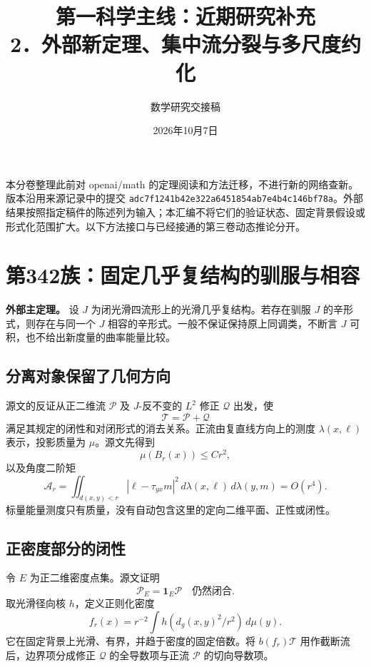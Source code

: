 \documentclass[UTF8,11pt,fontset=none]{ctexart}
\title{第一科学主线：近期研究补充\\[6pt]\large 2．外部新定理、集中流分裂与多尺度约化}
\author{数学研究交接稿}\date{2026年10月7日}
\theoremstyle{definition}
\theoremstyle{remark}
\begin{document}
\maketitle
\tableofcontents
\clearpage
本分卷整理此前对 openai/math 的定理阅读和方法迁移，不进行新的网络查新。版本沿用来源记录中的提交 \texttt{adc7f1241b42e322a6451854ab7e4b4c146bf78a}。外部结果按照指定稿件的陈述列为输入；本汇编不将它们的验证状态、固定背景假设或形式化范围扩大。以下方法接口与已经接通的第三卷动态推论分开。\cite{R01,R02}

\section{第342族：固定几乎复结构的驯服与相容}\label{v2-ux7b2c342ux65cfux56faux5b9aux51e0ux4e4eux590dux7ed3ux6784ux7684ux9a6fux670dux4e0eux76f8ux5bb9}

\textbf{外部主定理。} 设 \(J\) 为闭光滑四流形上的光滑几乎复结构。若存在驯服 \(J\) 的辛形式，则存在与同一个 \(J\) 相容的辛形式。一般不保证保持原上同调类，不断言 \(J\) 可积，也不给出新度量的曲率能量比较。\cite{OAI342}

\subsection{分离对象保留了几何方向}\label{v2-ux5206ux79bbux5bf9ux8c61ux4fddux7559ux4e86ux51e0ux4f55ux65b9ux5411}

源文的反证从正二维流 \(\mathscr P\) 及 \(J\)-反不变的 \(L^2\) 修正 \(\mathscr Q\) 出发，使 \[
 \mathscr T=\mathscr P+\mathscr Q
\] 满足其规定的闭性和对闭形式的消去关系。正流由复直线方向上的测度 \(\lambda(x,\ell)\) 表示，投影质量为 \(\mu\)。源文先得到 \[
 \mu(B_r(x))\le Cr^2,
\] 以及角度二阶矩 \[
 \mathcal A_r=
 \iint_{d(x,y)<r}|\ell-\tau_{yx}m|^2\,
 d\lambda(x,\ell)\,d\lambda(y,m)=O(r^4).
\tag{2.1}
\] 标量能量测度只有质量，没有自动包含这里的定向二维平面、正性或闭性。

\subsection{正密度部分的闭性}\label{v2-ux6b63ux5bc6ux5ea6ux90e8ux5206ux7684ux95edux6027}

令 \(E\) 为正二维密度点集。源文证明 \[
 \boxed{\mathscr P_E=\mathbf1_E\mathscr P\quad\text{仍然闭合}.}
\tag{2.2}
\] 取光滑径向核 \(h\)，定义正则化密度 \[
 f_r(x)=r^{-2}\int h(d_g(x,y)^2/r^2)\,d\mu(y).
\] 它在固定背景上光滑、有界，并趋于密度的固定倍数。将 \(b(f_r)\mathscr T\) 用作截断流后，边界项分成修正 \(\mathscr Q\) 的全导数项与正流 \(\mathscr P\) 的切向导数项。
\end{document}
